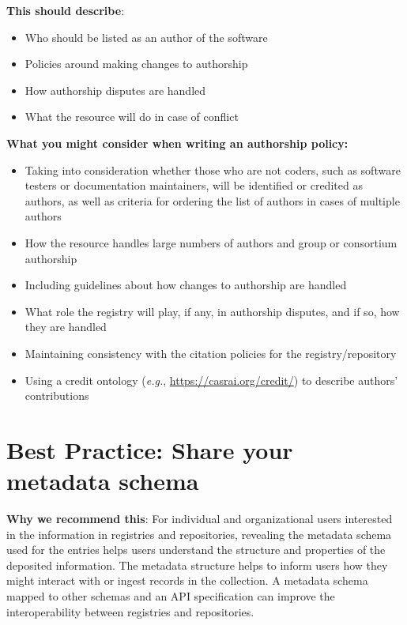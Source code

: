 \documentclass[11pt]{article}
\begin{document}
\textbf{This should describe}:

\begin{itemize}
\item Who should be listed as an author of the software

\item Policies around making changes to authorship

\item How authorship disputes are handled

\item What the resource will do in case of conflict

\end{itemize}

\textbf{What you might consider when writing an authorship policy:}

\begin{itemize}
\item Taking into consideration whether those who are not coders, such as software testers or documentation maintainers, will be identified or credited as authors, as well as criteria for ordering the list of authors in cases of multiple authors

\item How the resource handles large numbers of authors and group or consortium authorship

\item Including guidelines about how changes to authorship are handled

\item What role the registry will play, if any, in authorship disputes, and if so, how they are handled

\item Maintaining consistency with the citation policies for the registry/repository

\item Using a credit ontology (\emph{e.g.}, \url{https://casrai.org/credit/}) to describe authors' contributions

\end{itemize}


\section{Best Practice: Share your metadata schema}
\label{best-practice-share-your-metadata-schema}

\textbf{Why we recommend this}: For individual and organizational users interested in the information in registries and repositories, revealing the metadata schema used for the entries helps users understand the structure and properties of the deposited information. The metadata structure helps to inform users how they might interact with or ingest records in the collection. A metadata schema mapped to other schemas and an API specification can improve the interoperability between registries and repositories.
\end{document}

